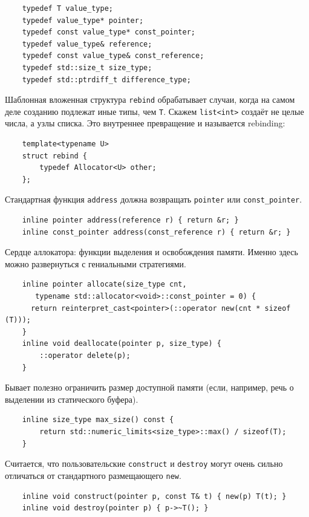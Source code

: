 \documentclass[a4paper,12pt,oneside]{article}
\begin{document}
\begin{lstlisting}
    typedef T value_type;
    typedef value_type* pointer;
    typedef const value_type* const_pointer;
    typedef value_type& reference;
    typedef const value_type& const_reference;
    typedef std::size_t size_type;
    typedef std::ptrdiff_t difference_type;
\end{lstlisting}

Шаблонная вложенная структура \lstinline!rebind! обрабатывает случаи, когда на самом деле созданию подлежат иные типы, чем \lstinline!T!. Скажем \lstinline!list<int>! создаёт не целые числа, а узлы списка. Это внутреннее превращение и называется rebinding:

\begin{lstlisting}
    template<typename U>
    struct rebind {
        typedef Allocator<U> other;
    };
\end{lstlisting}

Стандартная функция \lstinline!address! должна возвращать \lstinline!pointer! или \lstinline!const_pointer!.

\begin{lstlisting}
    inline pointer address(reference r) { return &r; }
    inline const_pointer address(const_reference r) { return &r; }
\end{lstlisting}

Сердце аллокатора: функции выделения и освобождения памяти. Именно здесь можно развернуться с гениальными стратегиями.

\begin{lstlisting}
    inline pointer allocate(size_type cnt, 
       typename std::allocator<void>::const_pointer = 0) { 
      return reinterpret_cast<pointer>(::operator new(cnt * sizeof (T))); 
    }
    inline void deallocate(pointer p, size_type) { 
        ::operator delete(p); 
    }
\end{lstlisting}

Бывает полезно ограничить размер доступной памяти (если, например, речь о выделении из статического буфера).

\begin{lstlisting}
    inline size_type max_size() const { 
        return std::numeric_limits<size_type>::max() / sizeof(T);
    }
\end{lstlisting}

Считается, что пользовательские \lstinline!construct! и \lstinline!destroy! могут очень сильно отличаться от стандартного размещающего \lstinline!new!.

\begin{lstlisting}
    inline void construct(pointer p, const T& t) { new(p) T(t); }
    inline void destroy(pointer p) { p->~T(); }
\end{lstlisting}
\end{document}
